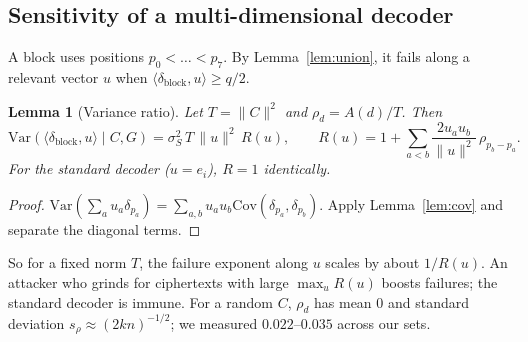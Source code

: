 \documentclass[11pt,a4paper]{article}
\newtheorem{lemma}[theorem]{Lemma}
\theoremstyle{definition}
\theoremstyle{remark}
\newcommand{\Var}{\mathrm{Var}}
\newcommand{\Cov}{\mathrm{Cov}}
\newcommand{\Anc}{A}
\begin{document}
\subsection{Sensitivity of a multi-dimensional decoder}
A block uses positions $p_0<\dots<p_7$. By Lemma~\ref{lem:union}, it fails along a relevant vector $u$ when $\langle\delta_{\text{block}},u\rangle\ge q/2$.

\begin{lemma}[Variance ratio]\label{lem:ratio}
Let $T=\|C\|^2$ and $\rho_d=\Anc(d)/T$. Then
\[ \Var(\langle\delta_{\text{block}},u\rangle\mid C,G)=\sigma_S^2\,T\,\|u\|^2\,R(u),\qquad R(u)=1+\sum_{a<b}\frac{2u_au_b}{\|u\|^2}\,\rho_{p_b-p_a}. \]
For the standard decoder ($u=e_i$), $R=1$ identically.
\end{lemma}
\begin{proof}
$\Var(\sum_au_a\delta_{p_a})=\sum_{a,b}u_au_b\Cov(\delta_{p_a},\delta_{p_b})$. Apply Lemma~\ref{lem:cov} and separate the diagonal terms.
\end{proof}

So for a fixed norm $T$, the failure exponent along $u$ scales by about $1/R(u)$. An attacker who grinds for ciphertexts with large $\max_uR(u)$ boosts failures; the standard decoder is immune. For a random $C$, $\rho_d$ has mean 0 and standard deviation $s_\rho\approx(2kn)^{-1/2}$; we measured $0.022$--$0.035$ across our sets.
\end{document}
